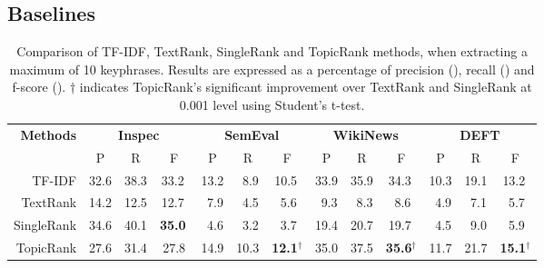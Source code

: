   \subsection{Baselines}
  \label{subsec:baselines}
    \begin{table}
      \centering
      \begin{tabular}{@{ }rcccccccccccc@{ }}
        \toprule
        \multirow{2}{*}[-2pt]{\textbf{Methods}} & \multicolumn{3}{c}{\textbf{Inspec}} & \multicolumn{3}{c}{\textbf{SemEval}} & \multicolumn{3}{c}{\textbf{WikiNews}} & \multicolumn{3}{c}{\textbf{DEFT}}\\
        \cmidrule(lr){2-4}\cmidrule(lr){5-7}\cmidrule(lr){8-10}\cmidrule(l){11-13}
        & P & R & F & P & R & F & P & R & F & P & R & F\\
        \midrule
        TF-IDF & 32.6 & 38.3 & 33.2$^{~}$ & 13.2 & $~~$8.9 & 10.5$^{~}$ & 33.9 & 35.9 & 34.3$^{~}$ & 10.3 & 19.1 & 13.2$^{~}$\\
        TextRank & 14.2 & 12.5 & 12.7$^{~}$ & $~~$7.9 & $~~$4.5 & $~~$5.6$^{~}$ & $~~$9.3 & $~~$8.3 & $~~$8.6$^{~}$ & $~~$4.9 & $~~$7.1 & $~~$5.7$^{~}$\\
        SingleRank & 34.6 & 40.1 & \textbf{35.0}$^{~}$ & $~~$4.6 & $~~$3.2 & $~~$3.7$^{~}$ & 19.4 & 20.7 & 19.7$^{~}$ & $~~$4.5 & $~~$9.0 & $~~$5.9$^{~}$\\
        TopicRank & 27.6 & 31.4 & 27.8  & 14.9 & 10.3 & \textbf{12.1}$^\dagger$ & 35.0 & 37.5 & \textbf{35.6}$^\dagger$ & 11.7 & 21.7 & \textbf{15.1}$^\dagger$\\
        \bottomrule
      \end{tabular}
      \caption{Comparison of TF-IDF, TextRank, SingleRank and TopicRank methods,
               when extracting a maximum of 10 keyphrases. Results are expressed
               as a percentage of precision (), recall () and
               f-score (). $\dagger$ indicates TopicRank's significant
               improvement over TextRank and SingleRank at 0.001 level using
               Student's t-test. \label{tab:results}}
    \end{table}

